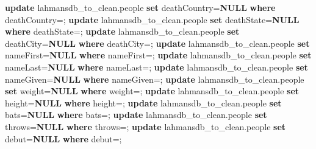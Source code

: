 \documentclass[11pt]{article}
\newenvironment{Shaded}{}{}
\newcommand{\KeywordTok}[1]{\textcolor[rgb]{0.00,0.44,0.13}{\textbf{{#1}}}}
\newcommand{\StringTok}[1]{\textcolor[rgb]{0.25,0.44,0.63}{{#1}}}
\newcommand{\NormalTok}[1]{{#1}}
\newcommand{\OperatorTok}[1]{\textcolor[rgb]{0.40,0.40,0.40}{{#1}}}
\begin{document}
\begin{Shaded}
\begin{Highlighting}[]
\KeywordTok{update}\NormalTok{ lahmansdb\_to\_clean.people}
\KeywordTok{set}\NormalTok{ deathCountry}\OperatorTok{=}\KeywordTok{NULL}
\KeywordTok{where}\NormalTok{ deathCountry}\OperatorTok{=}\StringTok{\textquotesingle{}\textquotesingle{}}\NormalTok{;}
\KeywordTok{update}\NormalTok{ lahmansdb\_to\_clean.people}
\KeywordTok{set}\NormalTok{ deathState}\OperatorTok{=}\KeywordTok{NULL}
\KeywordTok{where}\NormalTok{ deathState}\OperatorTok{=}\StringTok{\textquotesingle{}\textquotesingle{}}\NormalTok{;}
\KeywordTok{update}\NormalTok{ lahmansdb\_to\_clean.people}
\KeywordTok{set}\NormalTok{ deathCity}\OperatorTok{=}\KeywordTok{NULL}
\KeywordTok{where}\NormalTok{ deathCity}\OperatorTok{=}\StringTok{\textquotesingle{}\textquotesingle{}}\NormalTok{;}
\KeywordTok{update}\NormalTok{ lahmansdb\_to\_clean.people}
\KeywordTok{set}\NormalTok{ nameFirst}\OperatorTok{=}\KeywordTok{NULL}
\KeywordTok{where}\NormalTok{ nameFirst}\OperatorTok{=}\StringTok{\textquotesingle{}\textquotesingle{}}\NormalTok{;}
\KeywordTok{update}\NormalTok{ lahmansdb\_to\_clean.people}
\KeywordTok{set}\NormalTok{ nameLast}\OperatorTok{=}\KeywordTok{NULL}
\KeywordTok{where}\NormalTok{ nameLast}\OperatorTok{=}\StringTok{\textquotesingle{}\textquotesingle{}}\NormalTok{;}
\KeywordTok{update}\NormalTok{ lahmansdb\_to\_clean.people}
\KeywordTok{set}\NormalTok{ nameGiven}\OperatorTok{=}\KeywordTok{NULL}
\KeywordTok{where}\NormalTok{ nameGiven}\OperatorTok{=}\StringTok{\textquotesingle{}\textquotesingle{}}\NormalTok{;}
\KeywordTok{update}\NormalTok{ lahmansdb\_to\_clean.people}
\KeywordTok{set}\NormalTok{ weight}\OperatorTok{=}\KeywordTok{NULL}
\KeywordTok{where}\NormalTok{ weight}\OperatorTok{=}\StringTok{\textquotesingle{}\textquotesingle{}}\NormalTok{;}
\KeywordTok{update}\NormalTok{ lahmansdb\_to\_clean.people}
\KeywordTok{set}\NormalTok{ height}\OperatorTok{=}\KeywordTok{NULL}
\KeywordTok{where}\NormalTok{ height}\OperatorTok{=}\StringTok{\textquotesingle{}\textquotesingle{}}\NormalTok{;}
\KeywordTok{update}\NormalTok{ lahmansdb\_to\_clean.people}
\KeywordTok{set}\NormalTok{ bats}\OperatorTok{=}\KeywordTok{NULL}
\KeywordTok{where}\NormalTok{ bats}\OperatorTok{=}\StringTok{\textquotesingle{}\textquotesingle{}}\NormalTok{;}
\KeywordTok{update}\NormalTok{ lahmansdb\_to\_clean.people}
\KeywordTok{set}\NormalTok{ throws}\OperatorTok{=}\KeywordTok{NULL}
\KeywordTok{where}\NormalTok{ throws}\OperatorTok{=}\StringTok{\textquotesingle{}\textquotesingle{}}\NormalTok{;}
\KeywordTok{update}\NormalTok{ lahmansdb\_to\_clean.people}
\KeywordTok{set}\NormalTok{ debut}\OperatorTok{=}\KeywordTok{NULL}
\KeywordTok{where}\NormalTok{ debut}\OperatorTok{=}\StringTok{\textquotesingle{}\textquotesingle{}}\NormalTok{;}

\end{Highlighting}
\end{Shaded}
\end{document}
